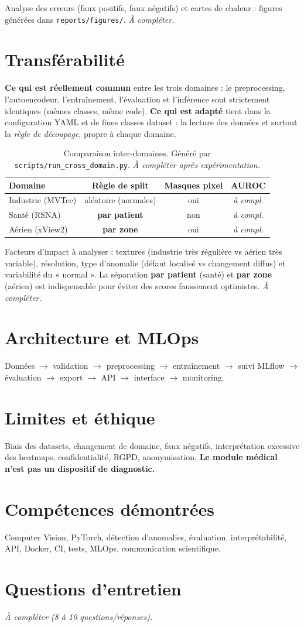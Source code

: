 \documentclass[11pt,a4paper]{article}
\begin{document}
Analyse des erreurs (faux positifs, faux négatifs) et cartes de chaleur :
figures générées dans \texttt{reports/figures/}. \emph{À compléter.}

\section{Transférabilité}

\textbf{Ce qui est réellement commun} entre les trois domaines : le
preprocessing, l'autoencodeur, l'entraînement, l'évaluation et l'inférence sont
strictement identiques (mêmes classes, même code). \textbf{Ce qui est adapté}
tient dans la configuration YAML et de fines classes dataset : la lecture des
données et surtout la \emph{règle de découpage}, propre à chaque domaine.

\begin{table}[h]
\centering
\begin{tabular}{lccc}
\toprule
Domaine & Règle de split & Masques pixel & AUROC \\
\midrule
Industrie (MVTec) & aléatoire (normales) & oui & \emph{à compl.} \\
Santé (RSNA) & \textbf{par patient} & non & \emph{à compl.} \\
Aérien (xView2) & \textbf{par zone} & oui & \emph{à compl.} \\
\bottomrule
\end{tabular}
\caption{Comparaison inter-domaines. Généré par \texttt{scripts/run\_cross\_domain.py}.
\emph{À compléter après expérimentation.}}
\end{table}

Facteurs d'impact à analyser : textures (industrie très régulière vs aérien
très variable), résolution, type d'anomalie (défaut localisé vs changement
diffus) et variabilité du « normal ». La séparation \textbf{par patient}
(santé) et \textbf{par zone} (aérien) est indispensable pour éviter des scores
faussement optimistes. \emph{À compléter.}

\section{Architecture et MLOps}
Données $\rightarrow$ validation $\rightarrow$ preprocessing $\rightarrow$
entraînement $\rightarrow$ suivi MLflow $\rightarrow$ évaluation $\rightarrow$
export $\rightarrow$ API $\rightarrow$ interface $\rightarrow$ monitoring.

\section{Limites et éthique}
Biais des datasets, changement de domaine, faux négatifs, interprétation
excessive des heatmaps, confidentialité, RGPD, anonymisation. \textbf{Le
module médical n'est pas un dispositif de diagnostic.}

\section{Compétences démontrées}
Computer Vision, PyTorch, détection d'anomalies, évaluation,
interprétabilité, API, Docker, CI, tests, MLOps, communication scientifique.

\section{Questions d'entretien}
\emph{À compléter (8 à 10 questions/réponses).}
\end{document}
